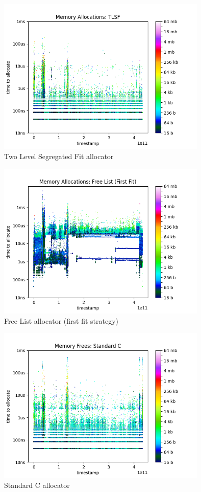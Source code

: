 \documentclass{article}
\begin{document}
\begin{figure}[htbp]
	\centering
	\includegraphics[width=10cm]{results_tlsf_alloc}
	\captionsetup{width=10cm}
	\caption{Two Level Segregated Fit allocator}
\end{figure}
\begin{figure}[htbp]
	\centering
	\includegraphics[width=10cm]{results_first_alloc}
	\captionsetup{width=10cm}
	\caption{Free List allocator (first fit strategy)}
\end{figure}
\begin{figure}[htbp]
	\centering
	\includegraphics[width=10cm]{results_vanilla_free}
	\captionsetup{width=10cm}
	\caption{Standard C allocator}
\end{figure}
\end{document}
